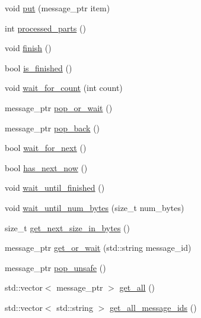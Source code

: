 \begin{DoxyCompactItemize}
\item 
void \hyperlink{classral_1_1cache_1_1WaitingQueue_a8049784eaf2ca3f33b3ed9accd2222d2}{put} (message\+\_\+ptr item)
\item 
int \hyperlink{classral_1_1cache_1_1WaitingQueue_af3afa691f12cfe644d86e8c1f99a31ec}{processed\+\_\+parts} ()
\item 
void \hyperlink{classral_1_1cache_1_1WaitingQueue_af489dc4d0c5cb810109beb3e9ff97062}{finish} ()
\item 
bool \hyperlink{classral_1_1cache_1_1WaitingQueue_a33631ea402ae98a42b144bc3f1453341}{is\+\_\+finished} ()
\item 
void \hyperlink{classral_1_1cache_1_1WaitingQueue_abd7d9824f1b89ead2c937e1c6d64ba4f}{wait\+\_\+for\+\_\+count} (int count)
\item 
message\+\_\+ptr \hyperlink{classral_1_1cache_1_1WaitingQueue_afbc5898a999bb8b5257c5de1b656db1c}{pop\+\_\+or\+\_\+wait} ()
\item 
message\+\_\+ptr \hyperlink{classral_1_1cache_1_1WaitingQueue_a259a82267567c6b5da96bd1bac53f6db}{pop\+\_\+back} ()
\item 
bool \hyperlink{classral_1_1cache_1_1WaitingQueue_a2849a6f841c2958aba489237a24ec0df}{wait\+\_\+for\+\_\+next} ()
\item 
bool \hyperlink{classral_1_1cache_1_1WaitingQueue_ac365aaf9f942c2d5ac22087cbfaf5968}{has\+\_\+next\+\_\+now} ()
\item 
void \hyperlink{classral_1_1cache_1_1WaitingQueue_a008f9d8254330dff1e653bd41fe43d9a}{wait\+\_\+until\+\_\+finished} ()
\item 
void \hyperlink{classral_1_1cache_1_1WaitingQueue_a84d4f711f11a11970b381b5b5c5d5662}{wait\+\_\+until\+\_\+num\+\_\+bytes} (size\+\_\+t num\+\_\+bytes)
\item 
size\+\_\+t \hyperlink{classral_1_1cache_1_1WaitingQueue_acbb3be52777e0a087a969b220377177a}{get\+\_\+next\+\_\+size\+\_\+in\+\_\+bytes} ()
\item 
message\+\_\+ptr \hyperlink{classral_1_1cache_1_1WaitingQueue_a8225fd0f55e72bf630f261def644d527}{get\+\_\+or\+\_\+wait} (std\+::string message\+\_\+id)
\item 
message\+\_\+ptr \hyperlink{classral_1_1cache_1_1WaitingQueue_a0ba9790cb2d41d01f7721b9972e4ff44}{pop\+\_\+unsafe} ()
\item 
std\+::vector$<$ message\+\_\+ptr $>$ \hyperlink{classral_1_1cache_1_1WaitingQueue_a51a2c83824c2f9eefe8b938a19793645}{get\+\_\+all} ()
\item 
std\+::vector$<$ std\+::string $>$ \hyperlink{classral_1_1cache_1_1WaitingQueue_ace97207416c27ecbe0d356c096edb499}{get\+\_\+all\+\_\+message\+\_\+ids} ()

\end{DoxyCompactItemize}
